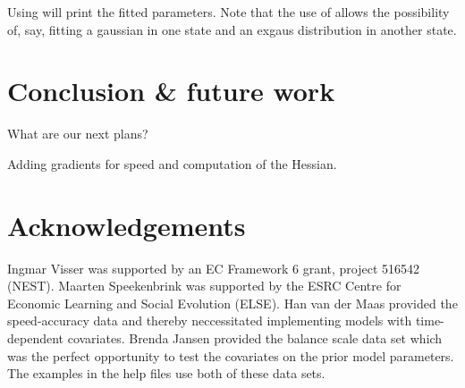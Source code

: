 \documentclass[article]{jss}
\begin{document}
Using  will print the fitted parameters. Note that the 
use of  allows the possibility of, say, fitting a 
gaussian in one state and an exgaus distribution in another state. 



\section{Conclusion \& future work}


What are our next plans?

Adding gradients for speed and computation of the Hessian. 


\section*{Acknowledgements} 

Ingmar Visser was supported by an EC Framework 6 grant, project 516542
(NEST).  Maarten Speekenbrink was supported by the ESRC Centre for
Economic Learning and Social Evolution (ELSE).  Han van der Maas
provided the speed-accuracy data \cite{Dutilh2009} and thereby
neccessitated implementing models with time-dependent covariates.
Brenda Jansen provided the balance scale data set \citep{Jansen2002}
which was the perfect opportunity to test the covariates on the prior
model parameters.  The examples in the help files use both of these
data sets.


\end{document}
